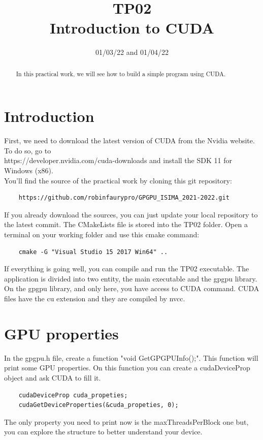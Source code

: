 \documentclass{article}
\begin{document}
\title{TP02\\Introduction to CUDA}
\date{01/03/22 and 01/04/22}
\maketitle

\begin{abstract}
	In this practical work, we will see how to build a simple program using CUDA.
\end{abstract}


\section{Introduction}
First, we need to download the latest version of CUDA from the Nvidia website. To do so, go to \\https://developer.nvidia.com/cuda-downloads and install the SDK 11 for Windows (x86).\\
You'll find the source of the practical work by cloning this git repository:
\begin{lstlisting}
	https://github.com/robinfaurypro/GPGPU_ISIMA_2021-2022.git
\end{lstlisting}
If you already download the sources, you can just update your local repository to the latest commit. The CMakeLists file is stored into the TP02 folder. Open a terminal on your working folder and use this cmake command:
\begin{lstlisting}
	cmake -G "Visual Studio 15 2017 Win64" ..
\end{lstlisting}
If everything is going well, you can compile and run the TP02 executable. The application is divided into two entity, the main executable and the gpgpu library. On the gpgpu library, and only here, you have access to CUDA command. CUDA files have the cu extension and they are compiled by nvcc.

\section{GPU properties}
In the gpgpu.h file, create a function "void GetGPGPUInfo();". This function will print some GPU properties. On this function you can create a cudaDeviceProp object and ask CUDA to fill it.
\begin{lstlisting}
	cudaDeviceProp cuda_propeties;
	cudaGetDeviceProperties(&cuda_propeties, 0);
\end{lstlisting}
The only property you need to print now is the maxThreadsPerBlock one but, you can explore the structure to better understand your device.
\end{document}
